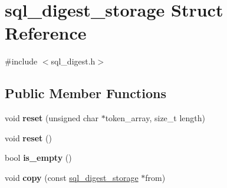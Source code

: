 \hypertarget{structsql__digest__storage}{}\section{sql\+\_\+digest\+\_\+storage Struct Reference}
\label{structsql__digest__storage}


{\ttfamily \#include $<$sql\+\_\+digest.\+h$>$}

\subsection*{Public Member Functions}
\begin{DoxyCompactItemize}
\item 
\mbox{\label{structsql__digest__storage_ab9cb38c7df4bc3568ccf539c8de1a922}} 
void {\bfseries reset} (unsigned char $\ast$token\+\_\+array, size\+\_\+t length)
\item 
\mbox{\label{structsql__digest__storage_af5d3d591c2096e0e3a70aeb6448cfddf}} 
void {\bfseries reset} ()
\item 
\mbox{\label{structsql__digest__storage_aeb6d721a5e311c739bdc95a054155cf2}} 
bool {\bfseries is\+\_\+empty} ()
\item 
\mbox{\label{structsql__digest__storage_a0b53d96218f6c22866ef3512f6ecaa37}} 
void {\bfseries copy} (const \mbox{\hyperlink{structsql__digest__storage}{sql\+\_\+digest\+\_\+storage}} $\ast$from)
\end{DoxyCompactItemize}
